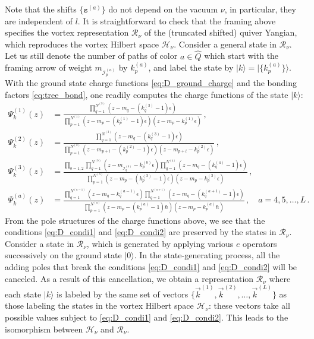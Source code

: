 \documentclass[12pt,a4paper]{article}
\renewcommand{\(}{\left(}
\renewcommand{\)}{\right)}
\newcommand{\eps}{\epsilon}
\renewcommand{\(}{\left(}
\renewcommand{\)}{\right)}
\begin{document}
Note that the shifts $\{\mathtt{s}^{(a)}\}$ do not depend on the vacuum $\nu$, in particular, they are independent of $l$.
It is straightforward to check that the framing above specifies the vortex representation $\mathcal{R}_\nu$ of the (truncated shifted) quiver Yangian, which reproduces the vortex Hilbert space $\mathcal{H}_\nu$.
Consider a general state in $\mathcal{R}_\nu$. 
Let us still denote the number of paths of color $a\in\widehat{Q}$ which start with the framing arrow of weight $m_{\mathcal{I}^{(a)}_p}$ by $k^{(a)}_p$, and label the state by $|k\rangle=|\{k^{(a)}_p\}\rangle$.
With the ground state charge functions \eqref{eq:D_ground_charge} and the bonding factors \eqref{eq:tree_bond}, one readily computes the charge functions of the state $|k\rangle$:
{\footnotesize
\begin{equation}\label{eq:Dtype_charge}
\begin{aligned}
\Psi^{(1)}_k(z)&=\frac{\prod_{q=1}^{N^{(3)}}(z-m_{q}-(k^{(3)}_{q}-1)\eps)}{\prod_{p=1}^{N^{(1)}}(z-m_{p}-(k^{(1)}_{p}-1)\eps)(z-m_{p}-k^{(1)}_{p}\eps)}\,,\\
\Psi^{(2)}_k(z)&=\frac{\prod_{q=1}^{N^{(3)}}(z-m_{q}-(k^{(3)}_{q}-1)\eps)}{\prod_{p=1}^{N^{(2)}}(z-m_{p+l}-(k^{(2)}_{p}-1)\eps)(z-m_{p+l}-k^{(2)}_{p}\eps)}\,,\\
\Psi^{(3)}_k(z)&=\frac{\prod_{b=1,2}\prod_{q=1}^{N^{(b)}}(z-m_{\mathcal{I}^{(b)}_{q}}-k^{(b)}_p\eps)\prod_{q=1}^{N^{(4)}}(z-m_{q}-(k^{(4)}_{q}-1)\eps)}{\prod_{p=1}^{N^{(3)}}(z-m_{p}-(k^{(3)}_{p}-1)\eps)(z-m_{p}-k^{(3)}_{p}\eps)}\,,\\
\Psi^{(a)}_k(z)&=\frac{\prod_{q=1}^{N^{(a-1)}}(z-m_{q}-k^{(a-1)}_q\eps)\prod_{q=1}^{N^{(a+1)}}(z-m_{q}-(k^{(a+1)}_{q}-1)\eps)}{\prod_{p=1}^{N^{(a)}}(z-m_{p}-(k^{(a)}_{p}-1)\hbar)(z-m_{p}-k^{(a)}_{p}\hbar)}\,,\quad a=4,5,\dots,L\,.
\end{aligned}
\end{equation}}
From the pole structures of the charge functions above, we see that the conditions \eqref{eq:D_condi1} and \eqref{eq:D_condi2} are preserved by the states in $\mathcal{R}_\nu$. 
Consider a state in $\mathcal{R}_\nu$, which is generated by applying various $e$ operators successively on the ground state $|0\rangle$. In the state-generating process, all the adding poles that break the conditions \eqref{eq:D_condi1} and \eqref{eq:D_condi2} will be canceled. 
As a result of this cancellation, we obtain a representation $\mathcal{R}_\nu$ where each state $|k\rangle$ is labeled by the same set of vectors $\{\vec{k}^{(1)},\vec{k}^{(2)},\dots , \vec{k}^{(L)}\}$ as those labeling the states in the vortex Hilbert space $\mathcal{H}_\nu$: these vectors take all possible values subject to \eqref{eq:D_condi1} and \eqref{eq:D_condi2}.
This leads to the isomorphism between $\mathcal{H}_\nu$ and $\mathcal{R}_\nu$.
\end{document}
